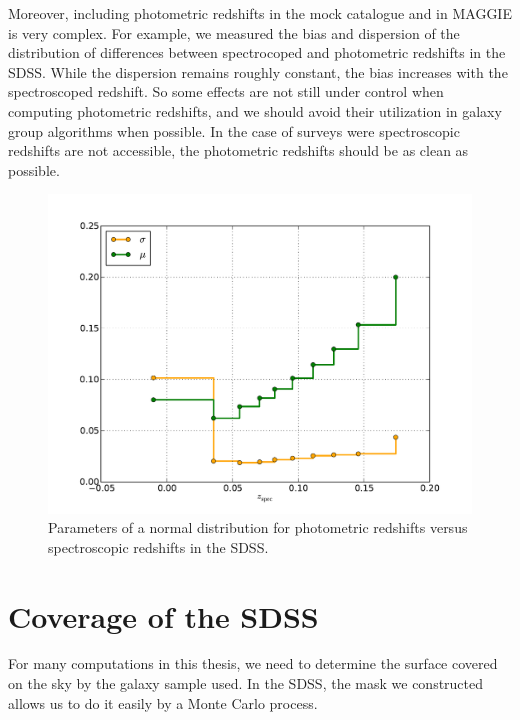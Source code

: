Moreover, including photometric redshifts in the mock catalogue and in MAGGIE
is very complex. For example, we measured the bias and dispersion of the
distribution of differences between spectrocoped and photometric redshifts in
the SDSS\@. While the dispersion remains roughly constant, the bias increases
with the spectroscoped redshift. So some effects are not still under control
when computing photometric redshifts, and we should avoid their utilization in
galaxy group algorithms when possible. In the case of surveys were
spectroscopic redshifts are not accessible, the photometric redshifts should be
as clean as possible.
%
\begin{figure}[htb] \centering
    \includegraphics[width=0.8\linewidth]{figures/sdss/redshift_difference.pdf}
    \caption{Parameters of a normal distribution for photometric redshifts
    versus spectroscopic redshifts in the
SDSS\@.\label{fig:redshift_difference}}
\end{figure}

\section{Coverage of the SDSS}

For many computations in this thesis, we need to determine the surface covered
on the sky by the galaxy sample used. In the SDSS, the mask we constructed
allows us to do it easily by a Monte Carlo process.

